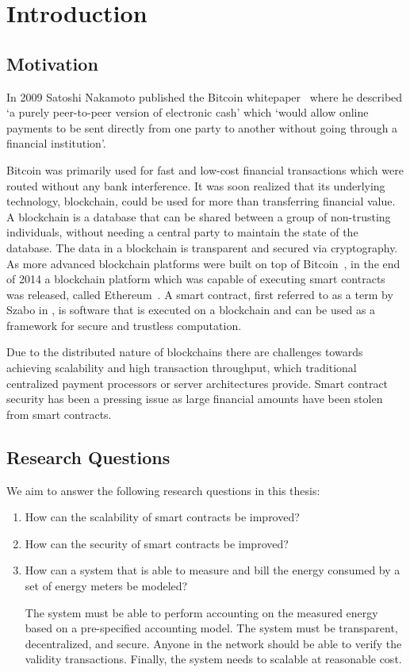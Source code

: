 \chapter{Introduction}

\section{Motivation}
In 2009 Satoshi Nakamoto published the Bitcoin whitepaper~\cite{bitcoin} where he described `a purely peer-to-peer version of electronic cash' which `would allow online payments to be sent directly from one party to another without going through a financial institution'. 

Bitcoin was primarily used for fast and low-cost financial transactions which were routed without any bank interference. It was soon realized that its underlying technology, blockchain, could be used for more than transferring financial value. A blockchain is a database that can be shared between a group of non-trusting individuals, without needing a central party to maintain the state of the database. The data in a blockchain is transparent and secured via cryptography. As more advanced blockchain platforms were built on top of Bitcoin~\cite{colored}, in the end of 2014 a blockchain platform which was capable of executing smart contracts was released, called Ethereum~\cite{vitalik}. A smart contract, first referred to as a term by Szabo in \cite{szabo}, is software that is executed on a blockchain and can be used as a framework for secure and trustless computation. 

Due to the distributed nature of blockchains there are challenges towards achieving scalability and high transaction throughput, which traditional centralized payment processors or server architectures provide. Smart contract security has been a pressing issue as large financial amounts have been stolen from smart contracts.

\section{Research Questions}
We aim to answer the following research questions in this thesis:

\begin{enumerate}\label{statement}
    \item How can the scalability of smart contracts be improved?
    \item How can the security of smart contracts be improved?
    \item How can a system that is able to measure and bill the energy consumed by a set of energy meters be modeled? 
    
    The system must be able to perform accounting on the measured energy based on a pre-specified accounting model. The system must be transparent, decentralized, and secure. Anyone in the network should be able to verify the validity transactions. Finally, the system needs to scalable at reasonable cost.
\end{enumerate}

